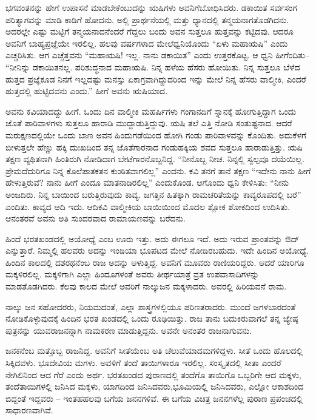 ಭಗವಂತನನ್ನು ಹೇಗೆ ಉಪಾಸನೆ ಮಾಡಬೇಕೆಂಬುದನ್ನು ಋಷಿಗಳು ಅವನಿಗೆ\break ಬೋಧಿಸಿದರು. ಡಕಾಯಿತ ಸರ್ವಸಂಗ ಪರಿತ್ಯಾಗವನ್ನು ಮಾಡಿ ಕಾಡಿಗೆ ಹೋದನು. ಅಲ್ಲಿ ಪ್ರಾರ್ಥನೆಯಲ್ಲಿ ಮತ್ತು ಧ್ಯಾನದಲ್ಲಿ ತನ್ಮಯನಾಗತೊಡಗಿದನು. ಅದರಲ್ಲೇ ಎಷ್ಟು ಮಟ್ಟಿಗೆ ತನ್ಮಯನಾದನೆಂದರೆ ಗೆದ್ದಲು ಬಂದು ಅವನ ಸುತ್ತಲೂ ಹುತ್ತವನ್ನು ಕಟ್ಟಿದವು. ಆದರೂ ಅವನಿಗೆ ಬಾಹ್ಯಪ್ರಜ್ಞೆಯೇ ಇರಲಿಲ್ಲ. ಹಲವು ವರ್ಷಗಳಾದ ಮೇಲೆ\break ಧ್ವನಿಯೊಂದು “ಏಳು ಮಹಾಋಷಿ” ಎಂದು ಎಚ್ಚರಿಸಿತು. ಆಗ ಎಚ್ಚೆತ್ತವನು “ಮಹಾಋಷಿ! ಇಲ್ಲ. ನಾನು ಡಕಾಯಿತ” ಎಂದು ಉತ್ತರಕೊಟ್ಟ. ಆ ಧ್ವನಿ ಹೀಗೆಂದಿತು– “ನೀನಿನ್ನು ಡಕಾಯಿತನಲ್ಲ. ಪರಿಶುದ್ಧನಾದ ಮಹಾಋಷಿ. ನಿನ್ನ ಹಳೆಯ ಹೆಸರು ಹೋಯಿತು. ನಿನ್ನ ಸುತ್ತಲೂ ಬೆಳೆದ ಹುತ್ತದ ಪ್ರಜ್ಞೆಕೂಡ ನಿನಗೆ ಇಲ್ಲದಷ್ಟು ಮನಸ್ಸು ಏಕಾಗ್ರವಾಗಿದ್ದುದರಿಂದ ಇನ್ನು ಮೇಲೆ ನಿನ್ನ ಹೆಸರು ವಾಲ್ಮೀಕಿ, ಎಂದರೆ ಹುತ್ತದಲ್ಲಿ ಹುಟ್ಟಿದವನು ಎಂದು.” ಹೀಗೆ ಅವನು ಋಷಿಯಾದ.

ಅವನು ಕವಿಯಾದದ್ದು ಹೀಗೆ. ಒಂದು ದಿನ ವಾಲ್ಮೀಕಿ ಮಹರ್ಷಿಗಳು ಗಂಗಾನದಿಗೆ ಸ್ನಾನಕ್ಕೆ ಹೋಗುತ್ತಿದ್ದಾಗ ಒಂದು ಜೊತೆ ಪಾರಿವಾಳಗಳು ಸುತ್ತಲೂ ಹಾರಾಡಿ ಮುದ್ದಾಡುತ್ತಿದ್ದುವು. ಋಷಿ ತಲೆ ಎತ್ತಿ ನೋಡಿ ಸಂತುಷ್ಟನಾದ. ಆದರೆ ಮರುಕ್ಷಣದಲ್ಲಿಯೇ ಒಂದು ಬಾಣ ಅವನ ಹಿಂದುಗಡೆಯಿಂದ ಹೋಗಿ ಗಂಡು ಪಾರಿವಾಳವನ್ನು ಕೊಂದಿತು. ಅದು\break ಕೆಳಗೆ ಬೀಳುತ್ತಲೇ ಹೆಣ್ಣು ಹಕ್ಕಿ ದುಃಖದಿಂದ ತನ್ನ ಜೊತೆಗಾರನಾದ ಗಂಡುಹಕ್ಕಿಯ ಶವದ ಸುತ್ತಲೂ ಹಾರಾಡುತ್ತಿತ್ತು. ಋಷಿ ತಕ್ಷಣ ವ್ಯಥಿತನಾಗಿ ಹಿಂತಿರುಗಿ ನೋಡಿದಾಗ ಬೇಟೆಗಾರನೊಬ್ಬನಿದ್ದ. “ನೀನೊಬ್ಬ ನೀಚ. ನಿನ್ನಲ್ಲಿ ಸ್ವಲ್ಪವೂ ದಯೆಯಿಲ್ಲ. ಪ್ರೇಮದೆದುರಿಗೂ ನಿನ್ನ ಕೊಲೆಪಾತಕತನ ಕುಂಠಿತವಾಗಲಿಲ್ಲ” ಎಂದನು. ಕವಿ ತನಗೆ ತಾನೆ ತಕ್ಷಣ “ಇದೇನು ನಾನು ಹೀಗೆ ಹೇಳುತ್ತಿರುವೆ? ನಾನು ಹೀಗೆ ಎಂದೂ ಮಾತನಾಡಿರಲಿಲ್ಲ” ಎಂದುಕೊಂಡ. ಆಗೊಂದು ಧ್ವನಿ ಕೇಳಿಸಿತು: “ನೀನು ಅಂಜದಿರು. ನಿನ್ನ ಬಾಯಿಂದ ಬರುತ್ತಿರುವುದು ಕಾವ್ಯ. ಜಗತ್ತಿನ ಹಿತಕ್ಕಾಗಿ ರಾಮಚರಿತೆಯನ್ನು ಕಾವ್ಯರೂಪದಲ್ಲಿ ಬರೆ” ಎಂದಿತು. ಕಾವ್ಯದ ಆದಿ ಇದು. ಆದಿಕವಿ ವಾಲ್ಮೀಕಿಯ ಬಾಯಿಯಿಂದ ಮೊದಲ ಶ್ಲೋಕ ಶೋಕದಿಂದ ಉದಿಸಿತು. ಆನಂತರವೆ ಅವನು ಅತಿ ಸುಂದರವಾದ ರಾಮಾಯಣವನ್ನು ಬರೆದನು.

ಹಿಂದೆ ಭರತಖಂಡದಲ್ಲಿ ಅಯೋಧ್ಯೆ ಎಂಬ ಊರು ಇತ್ತು. ಅದು ಈಗಲೂ ಇದೆ. ಅದು ಇರುವ ಪ್ರಾಂತವನ್ನು ಔದ್​ ಎನ್ನುತ್ತಾರೆ. ನಿಮ್ಮಲ್ಲಿ ಹಲವರು ಅದನ್ನು ಇಂಡಿಯಾ ಭೂಪಟದ ಮೇಲೆ ನೋಡಿರಬಹುದು. ಇದೇ ಹಿಂದಿನ ಅಯೋಧ್ಯೆ. ಹಿಂದಿನ ಕಾಲದಲ್ಲಿ ದಶರಥನೆಂಬ ರಾಜ ಅದನ್ನು ಆಳುತ್ತಿದ್ದ. ಅವನಿಗೆ ಮೂವರು ರಾಣಿಯರಿದ್ದರು. ಆದರೆ ಯಾರಿಗೂ ಮಕ್ಕಳಿರಲಿಲ್ಲ. ಮಕ್ಕಳಿಗಾಗಿ ಎಲ್ಲಾ ಹಿಂದೂಗಳಂತೆ ಅವರು ತೀರ್ಥಯಾತ್ರೆ ವ್ರತ ಉಪವಾಸಾದಿಗಳನ್ನು ಮಾಡತೊಡಗಿದರು. ಕೆಲವು ಕಾಲದ ಮೇಲೆ ಅವರಿಗೆ ನಾಲ್ಕುಜನ ಮಕ್ಕಳಾದರು. ಅವರಲ್ಲಿ ಹಿರಿಯವನೆ ರಾಮ.

ನಾಲ್ಕು ಜನ ಸಹೋದರರು, ನಿಯಮದಂತೆ, ಎಲ್ಲಾ ಶಾಸ್ತ್ರಗಳಲ್ಲಿಯೂ ಪರಿಣತರಾದರು. ಮುಂದೆ ಜಗಳಬಾರದಂತೆ ನೋಡಿಕೊಳ್ಳುವುದಕ್ಕೆ ಹಿಂದಿನ ಭರತ ಖಂಡದಲ್ಲಿ ಒಂದು ರೂಢಿಯಿತ್ತು. ರಾಜ ತಾನು ಬದುಕಿರುವಾಗಲೆ ತನ್ನ ಜ್ಯೇಷ್ಠ ಪುತ್ರನನ್ನು ಯುವರಾಜನನ್ನಾಗಿ ನಾಮಕರಣ ಮಾಡುತ್ತಿದ್ದನು. ಅವನೇ ಅನಂತರ ರಾಜನಾಗುವನು.

ಜನಕನೆಂಬ ಮತ್ತೊಬ್ಬ ರಾಜನಿದ್ದ. ಅವನಿಗೆ ಸೀತೆಯೆಂಬ ಅತಿ ಚೆಲುವೆಯಾದ\break ಮಗಳಿದ್ದಳು. ಸೀತೆ ಒಂದು ಹೊಲದಲ್ಲಿ ಸಿಕ್ಕಿದವಳು. ಭೂದೇವಿಯ ಮಗಳು. ಅವಳಿಗೆ ತಂದೆ ತಾಯಿಗಳಾರೂ ಇರಲಿಲ್ಲ. ಸಂಸ್ಕೃತದಲ್ಲಿ ಸೀತಾ ಎಂದರೆ ನೇಗಿಲಿನಿಂದ ಆದ ಗೆರೆ ಎಂದು ಅರ್ಥ. ಭರತಖಂಡದ ಪುರಾಣದಲ್ಲಿ ತಂದೆಗೊ ತಾಯಿಗೊ ಒಬ್ಬರಿಗೇ ಆದ ಮಕ್ಕಳು, ತಂದೆತಾಯಿಗಳಲ್ಲಿ ಜನಿಸಿದ ಮಕ್ಕಳು, ಯಾಗದಿಂದ ಜನಿಸಿದವರು,\break ಭೂಮಿಯಲ್ಲಿ ಜನಿಸಿದವರು, ಎಲ್ಲೋ ಆಕಾಶದಿಂದ ಬಿದ್ದಂತೆ ಇದ್ದವರು – ಇಂತಹ\break ಹಲವು ಬಗೆಯ ಜನನಗಳಿವೆ. ಈ ಬಗೆಯ ವಿಚಿತ್ರ ಜನನಗಳೆಲ್ಲ ಪುರಾಣ ಪ್ರಪಂಚದಲ್ಲಿ ಸಾಧಾರಣವಾಗಿವೆ.

